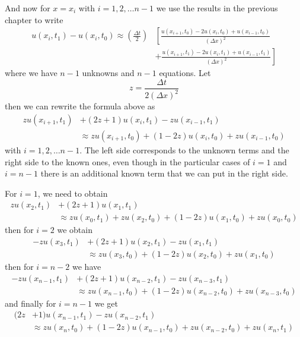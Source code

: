 \documentclass[00main.tex]{subfiles}
\begin{document}
And now for $x= x_i$ with $i= 1, 2, \hdots n-1$ we use the results in the previous chapter to write \begin{align*}
u(x_i, t_1) - u(x_i, t_0) \approx \left( \frac{\Delta t}{2} \right) &\left[ \frac{u(x_{i+1}, t_0)- 2u (x_i, t_0) + u(x_{i-1}, t_0)}{(\Delta x)^2}\right. \\ &+ \left. \frac{u(x_{i+1}, t_1) - 2u (x_i, t_1) + u(x_{i-1}, t_1)}{(\Delta x)^2} \right]
\end{align*} where we have $n-1$ unknowns and $n-1$ equations. Let \[ z = \frac{\Delta t}{2(\Delta x)^2} \] then we can rewrite the formula above as \begin{equation*}
\begin{split}
z u(x_{i+1}, t_1) &+ (2z +1) u(x_i, t_1) -z u (x_{i-1}, t_1)\\ &\approx z u(x_{i+1}, t_0) + (1-2z) u (x_i, t_0) + z u(x_{i-1}, t_0)
\end{split}
\end{equation*} with $i = 1,2, \hdots n-1$. The left side corresponds to the unknown terms and the right side to the known ones, even though in the particular cases of $i=1$ and $i=n-1$ there is an additional known term that we can put in the right side.

For $i=1$, we need to obtain \begin{align*}
z u(x_2, t_1) &+ (2z +1) u(x_1, t_1)\\ &\approx z u (x_0, t_1) + z u(x_2, t_0) + (1-2z) u (x_1, t_0) + z u(x_0, t_0)
\end{align*} then for $i=2$ we obtain \begin{align*}
- z u(x_3, t_1) &+ (2z +1) u(x_2, t_1) -z u (x_1, t_1)\\ & \approx z u(x_3, t_0) + (1-2z) u (x_2, t_0) + z u(x_1, t_0)
\end{align*} then for $i = n-2$ we have \begin{align*}
- z u(x_{n-1}, t_1) &+ (2z +1) u(x_{n-2}, t_1) -z u (x_{n-3}, t_1)\\ & \approx z u(x_{n-1}, t_0) + (1-2z) u (x_{n-2}, t_0) + z u(x_{n-3}, t_0)
\end{align*} and finally for $i=n-1$ we get \begin{align*}
  (2z &+1) u(x_{n-1}, t_1) -z u (x_{n-2}, t_1)\\ & \approx z u(x_n, t_0) + (1-2z) u (x_{n-1}, t_0) + z u(x_{n-2}, t_0) + z u(x_n, t_1)
\end{align*}
\end{document}
